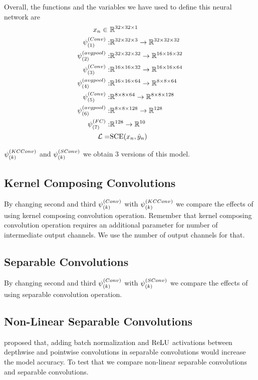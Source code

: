 Overall, the functions and the variables we have used to define this neural network are
\begin{equation*}
\begin{split}
x_{n} \in \ &\mathbb{R}^{32 \times 32 \times 1}\\
\psi^{(Conv)}_{(1)}:& \mathbb{R}^{32 \times 32 \times 3} \rightarrow \mathbb{R}^{32 \times 32 \times 32} \\
\psi^{(avgpool)}_{(2)}:& \mathbb{R}^{32 \times 32 \times 32} \rightarrow \mathbb{R}^{16 \times 16 \times 32} \\
\psi^{(Conv)}_{(3)}:& \mathbb{R}^{16 \times 16 \times 32} \rightarrow \mathbb{R}^{16 \times 16 \times 64} \\
\psi^{(avgpool)}_{(4)}:& \mathbb{R}^{16 \times 16 \times 64} \rightarrow \mathbb{R}^{8 \times 8 \times 64} \\
\psi^{(Conv)}_{(5)}:& \mathbb{R}^{8 \times 8 \times 64} \rightarrow \mathbb{R}^{8 \times 8 \times 128} \\
\psi^{(avgpool)}_{(6)}:& \mathbb{R}^{8 \times 8 \times 128} \rightarrow \mathbb{R}^{128} \\
\psi^{(FC)}_{(7)}:& \mathbb{R}^{128} \rightarrow \mathbb{R}^{10} \\
\mathcal{L} =& \textrm{SCE}(x_{n}, \hat{y}_{n})
\end{split}
\end{equation*}


 $\psi_{(k)}^{(KCConv)}$ and $\psi_{(k)}^{(SConv)}$ we obtain 3 versions of this model. 
\subsection{Kernel Composing Convolutions}
By changing second and third $\psi^{(Conv)}_{(k)}$ with $\psi_{(k)}^{(KCConv)}$ we compare the effects of using kernel composing convolution operation. Remember that kernel composing convolution operation requires an additional parameter for number of intermediate output channels. We use the number of output channels for that. 

\subsection{Separable Convolutions}
By changing second and third $\psi^{(Conv)}_{(k)}$ with $\psi_{(k)}^{(SConv)}$ we compare the effects of using separable convolution operation.

\subsection{Non-Linear Separable Convolutions}
\cite{howard2017mobilenets} proposed that, adding batch normalization and $\textrm{ReLU}$ activations between depthwise and pointwise convolutions in separable convolutions would increase the model accuracy. To test that we compare non-linear separable convolutions and separable convolutions.


